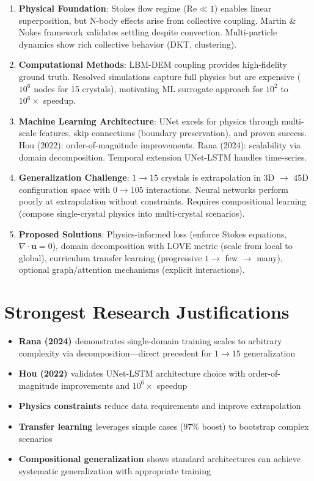 \begin{enumerate}
    \item \textbf{Physical Foundation}: Stokes flow regime ($\text{Re} \ll 1$) enables linear superposition, but N-body effects arise from collective coupling. Martin \& Nokes framework validates settling despite convection. Multi-particle dynamics show rich collective behavior (DKT, clustering).

    \item \textbf{Computational Methods}: LBM-DEM coupling provides high-fidelity ground truth. Resolved simulations capture full physics but are expensive ($10^6$ nodes for 15 crystals), motivating ML surrogate approach for $10^2$ to $10^6\times$ speedup.

    \item \textbf{Machine Learning Architecture}: UNet excels for physics through multi-scale features, skip connections (boundary preservation), and proven success. Hou (2022): order-of-magnitude improvements. Rana (2024): scalability via domain decomposition. Temporal extension UNet-LSTM handles time-series.

    \item \textbf{Generalization Challenge}: $1 \rightarrow 15$ crystals is extrapolation in $3$D $\rightarrow$ $45$D configuration space with $0 \rightarrow 105$ interactions. Neural networks perform poorly at extrapolation without constraints. Requires compositional learning (compose single-crystal physics into multi-crystal scenarios).

    \item \textbf{Proposed Solutions}: Physics-informed loss (enforce Stokes equations, $\nabla \cdot \mathbf{u} = 0$), domain decomposition with LOVE metric (scale from local to global), curriculum transfer learning (progressive $1 \rightarrow$ few $\rightarrow$ many), optional graph/attention mechanisms (explicit interactions).
\end{enumerate}

\section{Strongest Research Justifications}

\begin{itemize}
    \item \textbf{Rana (2024) \cite{rana2024}} demonstrates single-domain training scales to arbitrary complexity via decomposition---direct precedent for $1 \rightarrow 15$ generalization
    \item \textbf{Hou (2022) \cite{hou2022}} validates UNet-LSTM architecture choice with order-of-magnitude improvements and $10^6\times$ speedup
    \item \textbf{Physics constraints \cite{raissi2019,thuerey2020}} reduce data requirements and improve extrapolation
    \item \textbf{Transfer learning \cite{pellegrin2022}} leverages simple cases (97\% boost) to bootstrap complex scenarios
    \item \textbf{Compositional generalization \cite{lake2023}} shows standard architectures can achieve systematic generalization with appropriate training
\end{itemize}


